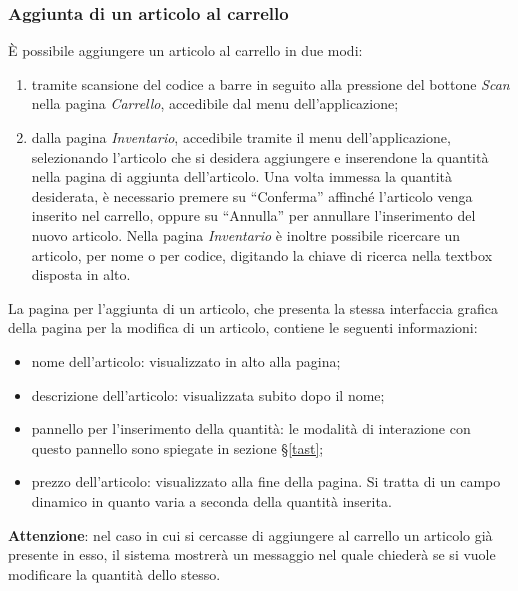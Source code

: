 \documentclass[12pt, a4paper, titlepage]{report}
\begin{document}
	\subsubsection{Aggiunta di un articolo al carrello}
	È possibile aggiungere un articolo al carrello in due modi: 
	\begin{enumerate}
		\item tramite scansione del codice a barre in seguito alla pressione del bottone \textit{Scan} nella pagina \textit{Carrello}, accedibile dal menu dell'applicazione;
		\item dalla pagina \textit{Inventario}, accedibile tramite il menu dell'applicazione, selezionando l'articolo che si desidera aggiungere e inserendone la quantità nella pagina di aggiunta dell'articolo. Una volta immessa la quantità desiderata, è necessario premere su ``Conferma'' affinché l'articolo venga inserito nel carrello, oppure su ``Annulla'' per annullare l'inserimento del nuovo articolo. Nella pagina \textit{Inventario} è inoltre possibile ricercare un articolo, per nome o per codice, digitando la chiave di ricerca nella textbox disposta in alto.
	\end{enumerate}
	La pagina per l'aggiunta di un articolo, che presenta la stessa interfaccia grafica della pagina per la modifica di un articolo, contiene le seguenti informazioni:
	\begin{itemize}
		\item nome dell'articolo: visualizzato in alto alla pagina;
		\item descrizione dell'articolo: visualizzata subito dopo il nome;
		\item pannello per l'inserimento della quantità: le modalità di interazione con questo pannello sono spiegate in sezione §\ref{tast};
		\item prezzo dell'articolo: visualizzato alla fine della pagina. Si tratta di un campo dinamico in quanto varia a seconda della quantità inserita.
	\end{itemize}
	\textbf{Attenzione}: nel caso in cui si cercasse di aggiungere al carrello un articolo già presente in esso, il sistema mostrerà un messaggio nel quale chiederà se si vuole modificare la quantità dello stesso.
	
\end{document}
